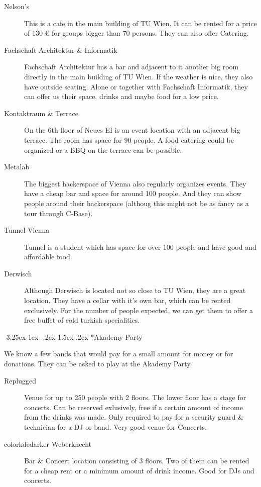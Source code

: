 \documentclass[10pt,a4paper]{article}
\makeatletter
\renewcommand\subsection{%
\@startsection{subsection}{2}{\z@}%
              {-3.25ex\@plus -1ex \@minus -.2ex}%
              {1.5ex \@plus .2ex}%
              {\color{kdelight}\sffamily\Large\bfseries}}
\makeatother
\begin{document}
\begin{description}
\item[\color{kdedarker} Nelson's] This is a cafe in the main building of TU Wien. It can be rented for a price of 130 \euro{} for groups bigger than 70 persons. They can also offer Catering.
\item[\color{kdedarker} Fachschaft Architektur \& Informatik] Fachschaft Architektur has a bar and adjacent to it another big room directly in the main building of TU Wien. If the weather is nice, they also have outside seating. Alone or together with Fachschaft Informatik, they can offer us their space, drinks and maybe food for a low price.
\item[\color{kdedarker} Kontaktraum \& Terrace] On the 6th floor of Neues EI is an event location with an adjacent big terrace. The room has space for 90 people. A food catering could be organized or a BBQ on the terrace can be possible.
\item[\color{kdedarker} Metalab] The biggest hackerspace of Vienna also regularly organizes events. They have a cheap bar and space for around 100 people. And they can show people around their hackerspace (althoug this might not be as fancy as a tour through C-Base).
\item[\color{kdedarker} Tunnel Vienna] Tunnel is a student which has space for over 100 people and have good and affordable food.
\item[\color{kdedarker} Derwisch] Although Derwisch is located not so close to TU Wien, they are a great location. They have a cellar with it's own bar, which can be rented exclusively. For the number of people expected, we can get them to offer a free buffet of cold turkish specialities.
\end{description}

\subsection*{Akademy Party}
We know a few bands that would pay for a small amount for money or for donations. They can be asked to play at the Akademy Party.

\begin{description}
\item[\color{kdedarker} Replugged] Venue for up to 250 people with 2 floors. The lower floor has a stage for concerts. Can be reserved exlusively, free if a certain amount of income from the drinks was made. Only required to pay for a security guard \& technician for a DJ or band. Very good venue for Concerts.
\item[color{kdedarker} Weberknecht] Bar \& Concert location consisting of 3 floors. Two of them can be rented for a cheap rent or a minimum amount of drink income. Good for DJs and concerts.
\end{description}
\end{document}
